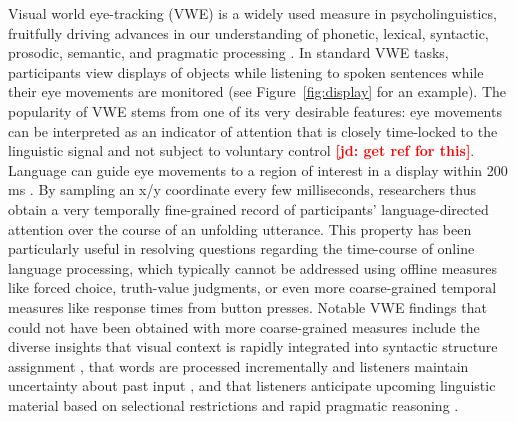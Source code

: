\documentclass[10pt,letterpaper]{article}
\newcommand{\figref}[1]{Figure~\ref{#1}}
\newcommand{\jd}[1]{\textcolor{Red}{\textbf{[jd: #1]}}}
\begin{document}
Visual world eye-tracking (VWE) is a widely used measure in psycholinguistics, fruitfully driving advances in our understanding of phonetic, lexical, syntactic, prosodic, semantic, and pragmatic processing  \cite{tanenhaus1995,Allopenna1998,altmann1999,clayards2008,SedivyEtAl1999:Achieving-Incremental-Semantic-,huang2009,kurumada2014}. %
In standard VWE tasks, participants view displays of objects while listening to spoken sentences while their eye movements are monitored (see \figref{fig:display} for an example). The popularity of VWE stems from one of its very desirable features: eye movements can be interpreted as an indicator of attention that is closely time-locked to the linguistic signal and not subject to voluntary control \jd{get ref for this}. Language can guide eye movements to a region of interest in a display within 200 ms \cite{Allopenna1998}. By sampling an x/y coordinate every few milliseconds, researchers thus obtain a very temporally fine-grained record of participants' language-directed attention over the course of an unfolding utterance. This property has been particularly useful in resolving questions regarding the time-course of online language processing, which typically cannot be addressed using offline measures like forced choice, truth-value judgments, or even more coarse-grained temporal measures like response times from button presses. Notable VWE findings that could not have been obtained with more coarse-grained measures include the diverse insights that visual context is rapidly integrated into syntactic structure assignment \cite{tanenhaus1995,chambers2004}, that words are processed incrementally and listeners maintain uncertainty about past input \cite{Allopenna1998,clayards2008}, and that listeners anticipate upcoming linguistic material based on selectional restrictions and rapid pragmatic reasoning \cite{altmann1999,SedivyEtAl1999:Achieving-Incremental-Semantic-}.
\end{document}
